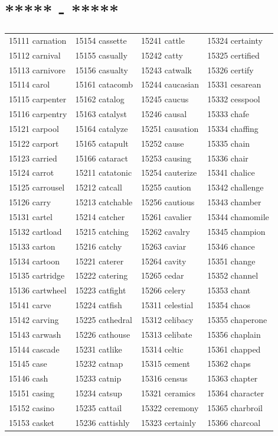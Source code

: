 \documentclass[10pt, oneside]{book}
\begin{document}
\begin{table}
	\centering
	\section*{***** - *****}
	\begin{tabular}{l l l l}
15111 carnation &15154 cassette &15241 cattle &15324 certainty\\
15112 carnival &15155 casually &15242 catty &15325 certified\\
15113 carnivore &15156 casualty &15243 catwalk &15326 certify\\
15114 carol &15161 catacomb &15244 caucasian &15331 cesarean\\
15115 carpenter &15162 catalog &15245 caucus &15332 cesspool\\
15116 carpentry &15163 catalyst &15246 causal &15333 chafe\\
15121 carpool &15164 catalyze &15251 causation &15334 chaffing\\
15122 carport &15165 catapult &15252 cause &15335 chain\\
15123 carried &15166 cataract &15253 causing &15336 chair\\
15124 carrot &15211 catatonic &15254 cauterize &15341 chalice\\
15125 carrousel &15212 catcall &15255 caution &15342 challenge\\
15126 carry &15213 catchable &15256 cautious &15343 chamber\\
15131 cartel &15214 catcher &15261 cavalier &15344 chamomile\\
15132 cartload &15215 catching &15262 cavalry &15345 champion\\
15133 carton &15216 catchy &15263 caviar &15346 chance\\
15134 cartoon &15221 caterer &15264 cavity &15351 change\\
15135 cartridge &15222 catering &15265 cedar &15352 channel\\
15136 cartwheel &15223 catfight &15266 celery &15353 chant\\
15141 carve &15224 catfish &15311 celestial &15354 chaos\\
15142 carving &15225 cathedral &15312 celibacy &15355 chaperone\\
15143 carwash &15226 cathouse &15313 celibate &15356 chaplain\\
15144 cascade &15231 catlike &15314 celtic &15361 chapped\\
15145 case &15232 catnap &15315 cement &15362 chaps\\
15146 cash &15233 catnip &15316 census &15363 chapter\\
15151 casing &15234 catsup &15321 ceramics &15364 character\\
15152 casino &15235 cattail &15322 ceremony &15365 charbroil\\
15153 casket &15236 cattishly &15323 certainly &15366 charcoal\\
	\end{tabular}
 \end{table}
\end{document}
